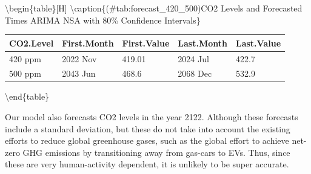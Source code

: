 \documentclass[
]{article}
\begin{document}
\textbackslash begin\{table\}{[}H{]}
\centering
\textbackslash caption\{(\#tab:forecast\_420\_500)CO2 Levels and Forecasted Times ARIMA NSA with 80\% Confidence Intervals\}
\centering
\fontsize{9}{11}\selectfont

\begin{tabular}[t]{l|l|l|l|l}
\hline
CO2.Level & First.Month & First.Value & Last.Month & Last.Value\\
\hline
420 ppm & 2022 Nov & 419.01 & 2024 Jul & 422.7\\
\hline
500 ppm & 2043 Jun & 468.6 & 2068 Dec & 532.9\\
\hline
\end{tabular}

\textbackslash end\{table\}

Our model also forecasts CO2 levels in the year 2122. Although these forecasts include a standard deviation, but these do not take into account the existing efforts to reduce global greenhouse gases, such as the global effort to achieve net-zero GHG emissions by transitioning away from gas-cars to EVs. Thus, since these are very human-activity dependent, it is unlikely to be super accurate.
\end{document}
